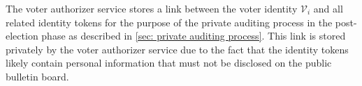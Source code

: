 The voter authorizer service stores a link between the voter identity $\mathcal{V}_i$ and all related identity tokens for the purpose of the private auditing process in the post-election phase as described in \cref{sec: private auditing process}. This link is stored privately by the voter authorizer service due to the fact that the identity tokens likely contain personal information that must not be disclosed on the public bulletin board.

\clearpage
\begin{landscape}
\begin{figure}[ht]
    \centering
\end{figure}
\end{landscape}
